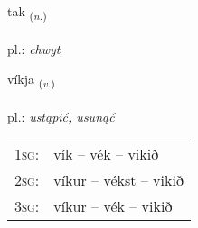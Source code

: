 \documentclass[frontgrid, backgrid]{flacards}\usepackage[]{graphicx}\usepackage[]{xcolor}
\begin{document}
\renewcommand{\flhead}{\vskip5pt \fboxsep=0pt {\small\bfseries\footnotesize Nafnorð | Noun}}
\renewcommand{\fcfoot}{\vskip5pt \fboxsep=0pt \hspace{2pt}{\small\bfseries\footnotesize 2K}}

\renewcommand{\blhead}{\vskip5pt {\small\bfseries\footnotesize Nafnorð | Noun }}
\renewcommand{\bcfoot}{\vskip5pt \hspace{2pt}{\small\bfseries\footnotesize 2K}}


{tak \small{\textsubscript{(\textit{n.})}} \\[1ex] %
\textphonetic{[tʰaːk]} \\
pl.: \emph{chwyt} \\  [2ex]
\renewcommand*{\arraystretch}{0.8}
}

\renewcommand{\flhead}{\vskip5pt \fboxsep=0pt {\small\bfseries\footnotesize Sagnorð | Verb}}
\renewcommand{\fcfoot}{\vskip5pt \fboxsep=0pt \hspace{2pt}{\small\bfseries\footnotesize 2K}}

\renewcommand{\blhead}{\vskip5pt {\small\bfseries\footnotesize Sagnorð | Verb }}
\renewcommand{\bcfoot}{\vskip5pt \hspace{2pt}{\small\bfseries\footnotesize 2K}}


{víkja \small{\textsubscript{(\textit{v.})}} \\[1ex] %
\textphonetic{[viːca]} \\
pl.: \emph{ustąpić, usunąć} \\  [2ex]
\renewcommand*{\arraystretch}{0.8}
\begin{tabular}{p{1cm}l}
\textsc{1sg}: & vík -- vék -- vikið \\ 
\textsc{2sg}: & víkur -- vékst -- vikið \\ 
\textsc{3sg}: & víkur -- vék -- vikið \\ 
\end{tabular}
}
\end{document}
